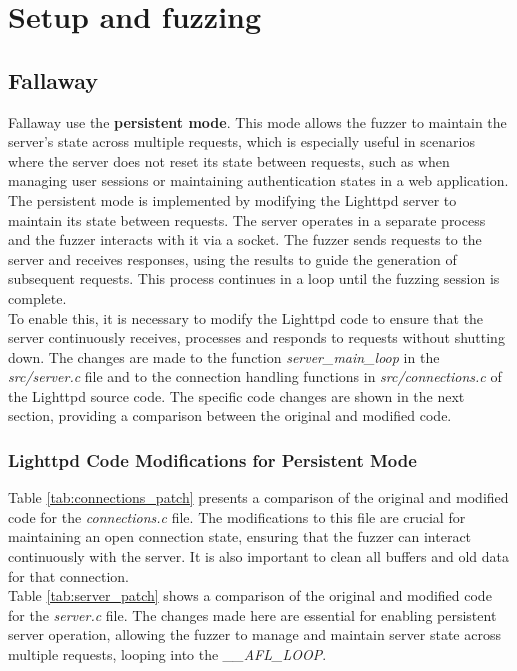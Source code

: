 \chapter{Setup and fuzzing}
\label{chap:Setup}

\section{Fallaway}
Fallaway use the \textbf{persistent mode}. This mode allows the fuzzer to maintain the server's state across multiple requests, which is especially useful in scenarios where the server does not reset its state between requests, such as when managing user sessions or maintaining authentication states in a web application.
\\The persistent mode is implemented by modifying the Lighttpd server to maintain its state between requests. The server operates in a separate process and the fuzzer interacts with it via a socket. The fuzzer sends requests to the server and receives responses, using the results to guide the generation of subsequent requests. This process continues in a loop until the fuzzing session is complete.
\\To enable this, it is necessary to modify the Lighttpd code to ensure that the server continuously receives, processes and responds to requests without shutting down. The changes are made to the function \textit{server\_main\_loop} in the \textit{src/server.c} file and to the connection handling functions in \textit{src/connections.c} of the Lighttpd source code. The specific code changes are shown in the next section, providing a comparison between the original and modified code.

\subsection{Lighttpd Code Modifications for Persistent Mode}

Table \ref{tab:connections_patch} presents a comparison of the original and modified code for the \textit{connections.c} file. The modifications to this file are crucial for maintaining an open connection state, ensuring that the fuzzer can interact continuously with the server. It is also important to clean all buffers and old data for that connection.
\\Table \ref{tab:server_patch} shows a comparison of the original and modified code for the \textit{server.c} file. The changes made here are essential for enabling persistent server operation, allowing the fuzzer to manage and maintain server state across multiple requests, looping into the \textit{\_\_AFL\_LOOP}.

